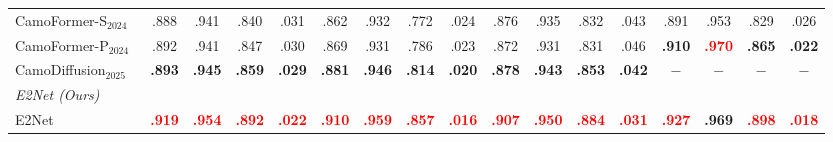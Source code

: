 \documentclass[a4paper,fleqn]{cas-dc}
\begin{document}
\begin{table}[t]
{\begin{tabular}{l|cccc|cccc|cccc|cccc}
			CamoFormer-S$_{2024}$~\citep{yin2024camoformer} & .888 & .941 & .840 & .031 & .862 & .932 & .772 & .024 & .876 & .935 & .832 & .043 & .891 & .953 & .829 & .026 \\
			CamoFormer-P$_{2024}$~\citep{yin2024camoformer} & .892 & .941 & .847 & .030 & .869 & .931 & .786 & .023 & .872 & .931 & .831 & .046 & \textbf{.910} & \textbf{\textcolor{red}{.970}} & \textbf{.865} & \textbf{.022} \\
			CamoDiffusion$_{2025}$~\citep{Sun2025camodiffusion} & \textbf{.893} & \textbf{.945} & \textbf{.859} & \textbf{.029} & \textbf{.881} & \textbf{.946} & \textbf{.814} & \textbf{.020} & \textbf{.878} & \textbf{.943} & \textbf{.853} & \textbf{.042} & $-$ & $-$ & $-$ & $-$ \\
			\midrule
			\multicolumn{17}{l}{\textit{E2Net (Ours)}} \\
			\midrule
			E2Net
			& \textbf{\textcolor{red}{.919}} & \textbf{\textcolor{red}{.954}} & \textbf{\textcolor{red}{.892}} & \textbf{\textcolor{red}{.022}}
			& \textbf{\textcolor{red}{.910}} & \textbf{\textcolor{red}{.959}} & \textbf{\textcolor{red}{.857}} & \textbf{\textcolor{red}{.016}}
			& \textbf{\textcolor{red}{.907}} & \textbf{\textcolor{red}{.950}}  & \textbf{\textcolor{red}{.884}} & \textbf{\textcolor{red}{.031}}
			& \textbf{\textcolor{red}{.927}} & \textbf{.969} & \textbf{\textcolor{red}{.898}} & \textbf{\textcolor{red}{.018}} \\
			\bottomrule
		\end{tabular}
	}
\end{table}
\end{document}

